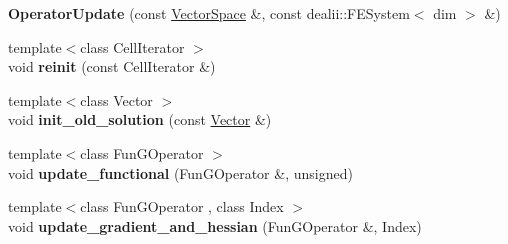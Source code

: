 \begin{DoxyCompactItemize}
\item 
\hypertarget{structSpacy_1_1dealII_1_1Detail_1_1OperatorUpdate_3_01dim_00_01VariableDims_00_01row_00-1_01_4_a74578c1a4703ae9befc3b687779df35a}{{\bfseries Operator\-Update} (const \hyperlink{classSpacy_1_1VectorSpace}{Vector\-Space} \&, const dealii\-::\-F\-E\-System$<$ dim $>$ \&)}\label{structSpacy_1_1dealII_1_1Detail_1_1OperatorUpdate_3_01dim_00_01VariableDims_00_01row_00-1_01_4_a74578c1a4703ae9befc3b687779df35a}

\item 
\hypertarget{structSpacy_1_1dealII_1_1Detail_1_1OperatorUpdate_3_01dim_00_01VariableDims_00_01row_00-1_01_4_aa6a8e0a8cad820ce4738c2fa23bd782a}{{\footnotesize template$<$class Cell\-Iterator $>$ }\\void {\bfseries reinit} (const Cell\-Iterator \&)}\label{structSpacy_1_1dealII_1_1Detail_1_1OperatorUpdate_3_01dim_00_01VariableDims_00_01row_00-1_01_4_aa6a8e0a8cad820ce4738c2fa23bd782a}

\item 
\hypertarget{structSpacy_1_1dealII_1_1Detail_1_1OperatorUpdate_3_01dim_00_01VariableDims_00_01row_00-1_01_4_a4c2b0195981d94e9c2b2c3cf861b71e5}{{\footnotesize template$<$class Vector $>$ }\\void {\bfseries init\-\_\-old\-\_\-solution} (const \hyperlink{group__VectorSpaceGroup_ga65d64ee5f22f492639d0f950aa931071}{Vector} \&)}\label{structSpacy_1_1dealII_1_1Detail_1_1OperatorUpdate_3_01dim_00_01VariableDims_00_01row_00-1_01_4_a4c2b0195981d94e9c2b2c3cf861b71e5}

\item 
\hypertarget{structSpacy_1_1dealII_1_1Detail_1_1OperatorUpdate_3_01dim_00_01VariableDims_00_01row_00-1_01_4_a868cb2004afc7a1a3b18e0417e680f7d}{{\footnotesize template$<$class Fun\-G\-Operator $>$ }\\void {\bfseries update\-\_\-functional} (Fun\-G\-Operator \&, unsigned)}\label{structSpacy_1_1dealII_1_1Detail_1_1OperatorUpdate_3_01dim_00_01VariableDims_00_01row_00-1_01_4_a868cb2004afc7a1a3b18e0417e680f7d}

\item 
\hypertarget{structSpacy_1_1dealII_1_1Detail_1_1OperatorUpdate_3_01dim_00_01VariableDims_00_01row_00-1_01_4_a5550959b158d6caa18db1d742d636f43}{{\footnotesize template$<$class Fun\-G\-Operator , class Index $>$ }\\void {\bfseries update\-\_\-gradient\-\_\-and\-\_\-hessian} (Fun\-G\-Operator \&, Index)}\label{structSpacy_1_1dealII_1_1Detail_1_1OperatorUpdate_3_01dim_00_01VariableDims_00_01row_00-1_01_4_a5550959b158d6caa18db1d742d636f43}


\end{DoxyCompactItemize}
